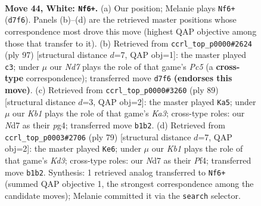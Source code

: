 \documentclass[11pt]{article}
\begin{document}
\clearpage

\begin{figure}[p]\centering
\begin{subfigure}{0.46\textwidth}\centering
\resizebox{\linewidth}{!}{%
\newchessgame
\chessboard[
  setfen={6k1/3N4/8/8/2p2P2/1pP5/4p3/1K6 w - - 0 44},
  showmover=false,
  pgfstyle=straightmove, color=movearrow, markmove={d7-f6}
]}
\caption{}
\end{subfigure}\hfill
\begin{subfigure}{0.46\textwidth}\centering
\resizebox{\linewidth}{!}{%
\newchessgame
\chessboard[
  setfen={8/8/2P1k1p1/8/2p2P1p/4K2P/8/8 b - - 2 49},
  showmover=false,
  pgfstyle=straightmove, color=movearrow, markmove={c4-c3}
]}
\caption{}
\end{subfigure}
\\[4pt]
\begin{subfigure}{0.46\textwidth}\centering
\resizebox{\linewidth}{!}{%
\newchessgame
\chessboard[
  setfen={8/5p2/k7/2p5/P3p1P1/1P6/3K4/8 b - - 3 45},
  showmover=false,
  pgfstyle=straightmove, color=movearrow, markmove={a6-a5}
]}
\caption{}
\end{subfigure}\hfill
\begin{subfigure}{0.46\textwidth}\centering
\resizebox{\linewidth}{!}{%
\newchessgame
\chessboard[
  setfen={8/8/3k1p2/1K5p/4Pp2/5P1P/8/8 b - - 0 40},
  showmover=false,
  pgfstyle=straightmove, color=movearrow, markmove={d6-e6}
]}
\caption{}
\end{subfigure}
\caption{\textbf{Move 44, White: \texttt{Nf6+}.} (a) Our position; Melanie plays \texttt{Nf6+} (\texttt{d7f6}). Panels (b)--(d) are the retrieved master positions whose correspondence most drove this move (highest QAP objective among those that transfer to it). (b) Retrieved from \texttt{ccrl\_top\_p0000\#2624} (ply 97) [structural distance $d$=7, QAP obj=1]: the master played \texttt{c3}; under $\mu$ our \emph{Nd7} plays the role of that game's \emph{Pc5} (a \textbf{cross-type} correspondence); transferred move \texttt{d7f6} \textbf{(endorses this move)}. (c) Retrieved from \texttt{ccrl\_top\_p0000\#3260} (ply 89) [structural distance $d$=3, QAP obj=2]: the master played \texttt{Ka5}; under $\mu$ our \emph{Kb1} plays the role of that game's \emph{Ka3}; cross-type roles: our \emph{N}d7 as their \emph{p}g4; transferred move \texttt{b1b2}. (d) Retrieved from \texttt{ccrl\_top\_p0003\#2706} (ply 79) [structural distance $d$=7, QAP obj=2]: the master played \texttt{Ke6}; under $\mu$ our \emph{Kb1} plays the role of that game's \emph{Kd3}; cross-type roles: our \emph{N}d7 as their \emph{P}f4; transferred move \texttt{b1b2}. Synthesis: 1 retrieved analog transferred to \texttt{Nf6+} (summed QAP objective 1, the strongest correspondence among the candidate moves); Melanie committed it via the \texttt{search} selector.}
\label{fig:thought-m86}
\end{figure}
\end{document}
